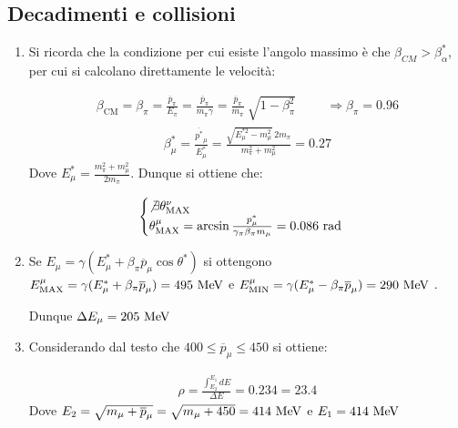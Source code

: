 \documentclass[12pt,twoside,a4]{article}
\begin{document}
\newpage
{}
\subsection{Decadimenti e collisioni}
\begin{solution}
\vspace{-1cm}
\begin{enumerate}[label=(\textit{\roman*})]
\item Si ricorda che la condizione per cui esiste l'angolo massimo è che $\beta_{CM} > \beta^{\ast}_{\alpha}$, per cui si calcolano direttamente le velocità:
 
 	\begin{gather*}
     \beta_\mathrm{CM} = \beta_\pi = \frac{\overline{p}_\pi}{E_\pi} =  \frac{\overline{p}_\pi}{m_\pi \gamma} = \frac{\overline{p}_\pi}{m_\pi} \ \sqrt{1 - \beta^2_\pi} \hspace{1cm}
     \Rightarrow  \boxed{\beta_\pi = 0.96}
 	\end{gather*}
 	\begin{gather*}
     \beta^\ast_\mu = \frac{\overline{p^\ast}_\mu}{E^\ast_\mu} = \frac{\sqrt{E^{\ast 2}_\mu - m^2_\mu} \ 2 m_\pi}{m^2_\pi + m^2_\mu} = 0.27
 	\end{gather*}
     Dove  $E^\ast_\mu = \frac{m^2_\pi + m^2_\mu}{2 m_\pi} $. Dunque si ottiene che:
	
	\begin{equation*}
	    \begin{cases}
	    \not\exists \theta^\nu_\mathrm{MAX} \\
	    \theta^\mu_\mathrm{MAX} = \arcsin{\frac{p^\ast_\mu}{\gamma_\pi \beta_\pi m_\mu}} = 0.086 \ \mathrm{rad}
	    \end{cases}
	\end{equation*}
	 
	\item Se $E_\mu = \gamma (E^\ast_\mu + \beta_\pi \overline{p}_\mu \cos{\theta^\ast})$ si ottengono $E^\mu_\mathrm{MAX} = \gamma (E^\ast_\mu + \beta_\pi \overline{p}_\mu) = 495 \ \mathrm{MeV}$ e $E^\mu_\mathrm{MIN} = \gamma (E^\ast_\mu - \beta_\pi \overline{p}_\mu) = 290 \ \mathrm{MeV}$ . 
 
	Dunque $\Delta E_\mu = 205 \ \mev$

	\item Considerando dal testo che $ 400 \le \overline{p}_\mu \le 450$ si ottiene: 
 	
 	\begin{gather*}
	     \rho = \frac{\int_{E_2}^{E_1} dE}{\Delta E} = 0.234 = 23.4 
	\end{gather*}
	Dove $E_2 = \sqrt{m_\mu + \overline{p}_\mu} = \sqrt{m_\mu + 450} = 414 \ \mathrm{MeV}$ e $
	     E_1 = 414 \ \mev$
\end{enumerate}
\end{solution}
\end{document}

